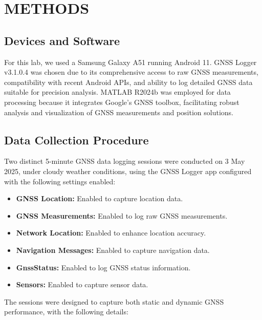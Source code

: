 
\section{METHODS} \label{sec:methods}


    \subsection{Devices and Software}
    For this lab, we used a Samsung Galaxy A51 running Android 11. GNSS Logger v3.1.0.4 was chosen due to its comprehensive access to raw GNSS measurements, compatibility with recent Android APIs, and ability to log detailed GNSS data suitable for precision analysis. MATLAB R2024b was employed for data processing because it integrates Google's GNSS toolbox, facilitating robust analysis and visualization of GNSS measurements and position solutions.

    \subsection{Data Collection Procedure}
    Two distinct 5-minute GNSS data logging sessions were conducted on 3 May 2025, under cloudy weather conditions, using the GNSS Logger app configured with the following settings enabled:

    \begin{itemize}
        \item \textbf{GNSS Location:} Enabled to capture location data.
        \item \textbf{GNSS Measurements:} Enabled to log raw GNSS measurements.
        \item \textbf{Network Location:} Enabled to enhance location accuracy.
        \item \textbf{Navigation Messages:} Enabled to capture navigation data.
        \item \textbf{GnssStatus:} Enabled to log GNSS status information.
        \item \textbf{Sensors:} Enabled to capture sensor data.
    \end{itemize}
    The sessions were designed to capture both static and dynamic GNSS performance, with the following details:

